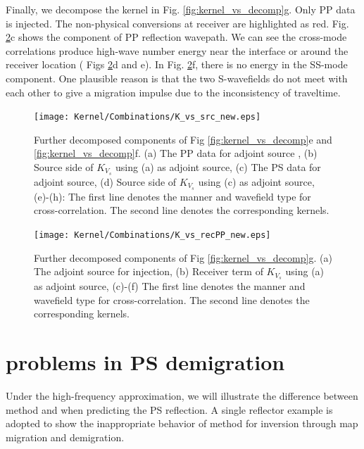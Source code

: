 \documentclass[extra,mreferee]{gji}
\newcommand{\Rome}[1]{{\bf\uppercase\expandafter{\romannumeral #1\relax}}}
\begin{document}
Finally, we decompose the kernel in Fig. \ref{fig:kernel_vs_decomp}g.
Only PP data is injected. The non-physical conversions at receiver are highlighted as red. 
Fig. \ref{fig:kernel_vs_recPP}c shows the component of PP reflection wavepath.
We can see the cross-mode correlations produce high-wave number energy near the interface or around the
receiver location ( Figs \ref{fig:kernel_vs_recPP}d and e).
In Fig. \ref{fig:kernel_vs_recPP}f,
there is no energy in the SS-mode component. One plausible reason is that the two S-wavefields do
not meet with each other to give a migration impulse due to the inconsistency of traveltime. 
\begin{figure}
   \centering
   {\texttt{[image: Kernel/Combinations/K\_vs\_src\_new.eps]}}
   \caption{
   Further decomposed components of Fig \ref{fig:kernel_vs_decomp}e and
   \ref{fig:kernel_vs_decomp}f. (a) The PP data for adjoint source
   , (b) Source side of $K_{V_s}$ using (a) as adjoint source, 
   (c) The PS data for adjoint source,
   (d) Source side of $K_{V_s}$ using (c) as adjoint source, 
   (e)-(h): 
   The first line denotes the manner and wavefield type for cross-correlation.
   The second line denotes the corresponding kernels.
   }
   \label{fig:kernel_vs_src}
\end{figure}
\begin{figure}
   \centering
   {\texttt{[image: Kernel/Combinations/K\_vs\_recPP\_new.eps]}}
   \caption{Further decomposed components of Fig \ref{fig:kernel_vs_decomp}g. (a) The adjoint source
   for injection, (b) Receiver term of $K_{V_s}$ using (a) as adjoint source, (c)-(f) 
   The first line denotes the manner and wavefield type for cross-correlation.
   The second line denotes the corresponding kernels.
   }
   \label{fig:kernel_vs_recPP}
\end{figure}
\section{problems in PS demigration}
Under the high-frequency approximation, we will illustrate the difference between method
\Rome{1} and \Rome{2} when
predicting the PS reflection.
A single reflector example is adopted to show the inappropriate behavior of method
\Rome{1} for inversion through 
map migration and demigration.

\end{document}

